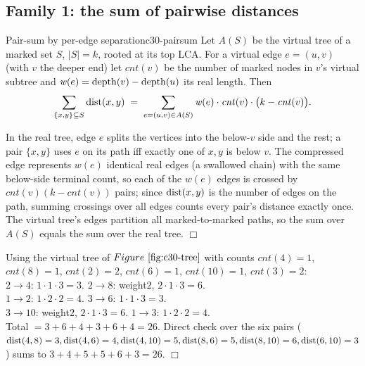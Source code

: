 \subsection{Family 1: the sum of pairwise distances}

\begin{theorem}{Pair-sum by per-edge separation}{c30-pairsum}
Let \(A(S)\) be the virtual tree of a marked set \(S\), \(|S|=k\), rooted at its top
LCA.  For a virtual edge \(e=(u,v)\) (with \(v\) the deeper end) let
\(\mathit{cnt}(v)\) be the number of marked nodes in \(v\)'s virtual subtree and
\(\mathit{w}(e)=\operatorname{depth}(v)-\operatorname{depth}(u)\) its real length.  Then
\[
  \sum_{\{x,y\}\subseteq S}\operatorname{dist}(x,y)
  \;=\; \sum_{e=(u,v)\in A(S)} \mathit{w}(e)\cdot \mathit{cnt}(v)\cdot\bigl(k-\mathit{cnt}(v)\bigr).
\]
\end{theorem}
\begin{proofbox}
In the real tree, edge \(e\) splits the vertices into the below-\(v\) side and the rest;
a pair \(\{x,y\}\) uses \(e\) on its path iff exactly one of \(x,y\) is below \(v\).  The
compressed edge represents \(\mathit{w}(e)\) identical real edges (a swallowed chain) with the
same below-side terminal count, so each of the \(\mathit{w}(e)\) edges is crossed by
\(\mathit{cnt}(v)(k-\mathit{cnt}(v))\) pairs; since \(\operatorname{dist}(x,y)\) is the number of edges on
the path, summing crossings over all edges counts every pair's distance exactly once.
The virtual tree's edges partition all marked-to-marked paths, so the sum over
\(A(S)\) equals the sum over the real tree. \(\Box\)
\end{proofbox}

\begin{tracebox}[Pair-sum on \(S=\{4,8,6,10\}\), \(k=4\): each virtual edge's share]
Using the virtual tree of \(\figref{c30-tree}\) with counts \(\mathit{cnt}(4){=}1\),
\(\mathit{cnt}(8){=}1\), \(\mathit{cnt}(2){=}2\), \(\mathit{cnt}(6){=}1\),
\(\mathit{cnt}(10){=}1\), \(\mathit{cnt}(3){=}2\):\\
\(2\!\to\!4\): \(1\cdot1\cdot3=3\). \quad \(2\!\to\!8\): weight\(2\), \(2\cdot1\cdot3=6\).\\
\(1\!\to\!2\): \(1\cdot2\cdot2=4\). \quad \(3\!\to\!6\): \(1\cdot1\cdot3=3\).\\
\(3\!\to\!10\): weight\(2\), \(2\cdot1\cdot3=6\). \quad \(1\!\to\!3\): \(1\cdot2\cdot2=4\).\\
Total \(=3+6+4+3+6+4=\boxed{26}\).  Direct check over the six pairs
(\(\operatorname{dist}(4,8)=3,\operatorname{dist}(4,6)=4,\operatorname{dist}(4,10)=5,\operatorname{dist}(8,6)=5,\operatorname{dist}(8,10)=6,\operatorname{dist}(6,10)=3\))
sums to \(3+4+5+5+6+3=26\). \(\Box\)
\end{tracebox}

